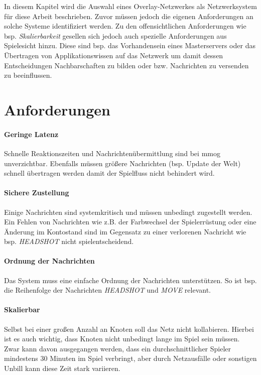 In diesem Kapitel wird die Auswahl eines Overlay-Netzwerkes als Netzwerksystem für diese Arbeit beschrieben. Zuvor müssen jedoch die eigenen Anforderungen an solche Systeme identifiziert werden. Zu den offensichtlichen Anforderungen wie bsp. \emph{Skalierbarkeit} gesellen sich jedoch auch spezielle Anforderungen aus Spielesicht hinzu. Diese sind bsp. das Vorhandensein eines Masterservers oder das Übertragen von Applikationswissen auf das Netzwerk um damit dessen Entscheidungen Nachbarschaften zu bilden oder bzw. Nachrichten zu versenden zu beeinflussen.

\section{Anforderungen}


\paragraph{Geringe Latenz} Schnelle Reaktionszeiten und Nachrichtenübermittlung sind bei \ac{mmog} unverzichtbar. Ebenfalls müssen größere Nachrichten (bsp. Update der Welt) schnell übertragen werden damit der Spielfluss nicht behindert wird.

\paragraph{Sichere Zustellung} Einige Nachrichten sind systemkritisch und müssen unbedingt zugestellt werden. Ein Fehlen von Nachrichten wie z.B. der Farbwechsel der Spielerrüstung oder eine Änderung im Kontostand sind im Gegensatz zu einer verlorenen Nachricht wie bsp. \emph{HEADSHOT} nicht spielentscheidend. 

\paragraph{Ordnung der Nachrichten} Das System muss eine einfache Ordnung der Nachrichten unterstützen. So ist bsp. die Reihenfolge der Nachrichten \emph{HEADSHOT} und \emph{MOVE} relevant.

\paragraph{Skalierbar} Selbst bei einer großen Anzahl an Knoten soll das Netz nicht kollabieren. Hierbei ist es auch wichtig, dass Knoten nicht unbedingt lange im Spiel sein müssen. Zwar kann davon ausgegangen werden, dass ein durchschnittlicher Spieler mindestens 30 Minuten im Spiel verbringt, aber durch Netzausfälle oder sonstigen Unbill kann diese Zeit stark variieren.

